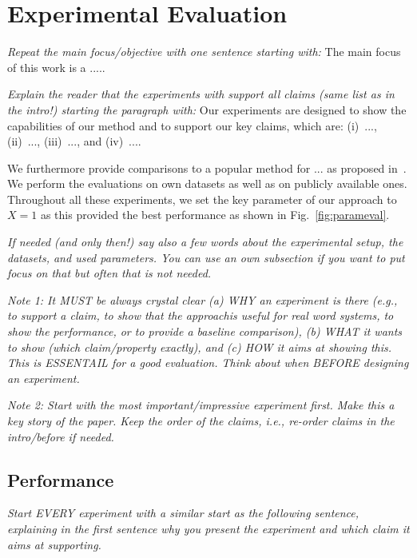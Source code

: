 \documentclass[letterpaper, 10 pt, conference]{ieeeconf}  %
\def\figref#1{Fig.~\ref{#1}}
\begin{document}
\section{Experimental Evaluation}
\label{sec:exp}

\emph{Repeat the main focus/objective with one sentence starting with:}
%
The main focus of this work is a  ..... 

\emph{Explain the reader that the experiments with support all claims
  (same list as in the intro!) starting the paragraph with:} 
%
Our experiments are designed to show the capabilities of our method and to
support our key claims, which are: 
%
(i)~..., 
%
(ii)~..., 
%
(iii)~..., and
%
(iv)~....

We furthermore provide comparisons to a popular method for ... as
proposed in~\cite{}.  We perform the evaluations on own datasets as
well as on publicly available ones.  Throughout all these experiments,
we set the key parameter of our approach to $X=1$ as this provided the
best performance as shown in \figref{fig:parameval}.

\emph{If needed (and only then!) say also a few words about the
  experimental setup, the datasets, and used parameters. You can use
  an own subsection if you want to put focus on that but often that is
  not needed.}

\emph{Note 1: It MUST be always crystal clear (a) WHY an experiment is
  there (e.g., to support a claim, to show that the approachis useful
  for real word systems, to show the performance, or to provide a
  baseline comparison), (b) WHAT it wants to show (which
  claim/property exactly), and (c) HOW it aims at showing this. This
  is ESSENTAIL for a good evaluation. Think about when BEFORE
  designing an experiment.}

\emph{Note 2: Start with the most important/impressive experiment
  first. Make this a key story of the paper. Keep the order of the
  claims, i.e., re-order claims in the intro/before if needed. }

\subsection{Performance}

\emph{Start EVERY experiment with a similar start as the following
  sentence, explaining in the first sentence why you present the
  experiment and which claim it aims at supporting.}
\end{document}
